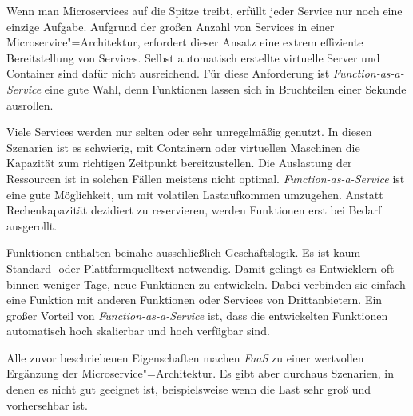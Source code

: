 Wenn man Microservices auf die Spitze treibt, erfüllt jeder Service nur noch eine einzige Aufgabe. Aufgrund der großen Anzahl von Services in einer Microservice"=Architektur, erfordert dieser Ansatz eine extrem effiziente Bereitstellung von Services. Selbst automatisch erstellte virtuelle Server und Container sind dafür nicht ausreichend. Für diese Anforderung ist \textit{Function-as-a-Service} eine gute Wahl, denn Funktionen lassen sich in Bruchteilen einer Sekunde ausrollen.

Viele Services werden nur selten oder sehr unregelmäßig genutzt. In diesen Szenarien ist es schwierig, mit Containern oder virtuellen Maschinen die Kapazität zum richtigen Zeitpunkt bereitzustellen. Die Auslastung der Ressourcen ist in solchen Fällen meistens nicht optimal. \textit{Function-as-a-Service} ist eine gute Möglichkeit, um mit volatilen Lastaufkommen umzugehen. Anstatt Rechenkapazität dezidiert zu reservieren, werden Funktionen erst bei Bedarf ausgerollt.

Funktionen enthalten beinahe ausschließlich Geschäftslogik. Es ist kaum Standard- oder Plattformquelltext notwendig. Damit gelingt es Entwicklern oft binnen weniger Tage, neue Funktionen zu entwickeln. Dabei verbinden sie einfach eine Funktion mit anderen Funktionen oder Services von Drittanbietern. Ein großer Vorteil von \textit{Function-as-a-Service} ist, dass die entwickelten Funktionen automatisch hoch skalierbar und hoch verfügbar sind.

Alle zuvor beschriebenen Eigenschaften machen \textit{FaaS} zu einer wertvollen Ergänzung der Microservice"=Architektur. Es gibt aber durchaus Szenarien, in denen es nicht gut geeignet ist, beispielsweise wenn die Last sehr groß und vorhersehbar ist.